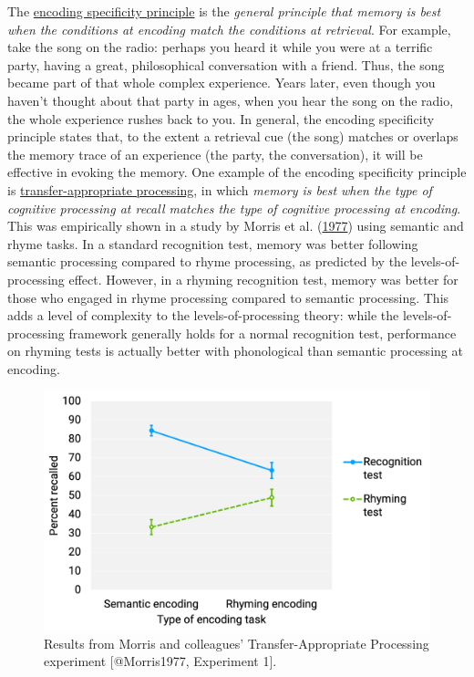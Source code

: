 \documentclass[
]{krantz}
\begin{document}
The \protect\hyperlink{encoding-specificity-principle}{encoding specificity principle} is the \emph{general principle that memory is best when the conditions at encoding match the conditions at retrieval}. For example, take the song on the radio: perhaps you heard it while you were at a terrific party, having a great, philosophical conversation with a friend. Thus, the song became part of that whole complex experience. Years later, even though you haven't thought about that party in ages, when you hear the song on the radio, the whole experience rushes back to you. In general, the encoding specificity principle states that, to the extent a retrieval cue (the song) matches or overlaps the memory trace of an experience (the party, the conversation), it will be effective in evoking the memory. One example of the encoding specificity principle is \protect\hyperlink{transfer-appropriate-processing}{transfer-appropriate processing}, in which \emph{memory is best when the type of cognitive processing at recall matches the type of cognitive processing at encoding}. This was empirically shown in a study by Morris et al. (\protect\hyperlink{ref-Morris1977}{1977}) using semantic and rhyme tasks. In a standard recognition test, memory was better following semantic processing compared to rhyme processing, as predicted by the levels-of-processing effect. However, in a rhyming recognition test, memory was better for those who engaged in rhyme processing compared to semantic processing. This adds a level of complexity to the levels-of-processing theory: while the levels-of-processing framework generally holds for a normal recognition test, performance on rhyming tests is actually better with phonological than semantic processing at encoding.

\begin{figure}

{\centering \includegraphics[width=0.7\linewidth]{images/ch5/fig6} 

}

\caption{Results from Morris and colleagues’ Transfer-Appropriate Processing experiment [@Morris1977, Experiment 1].}\label{fig:morris}
\end{figure}
\end{document}
